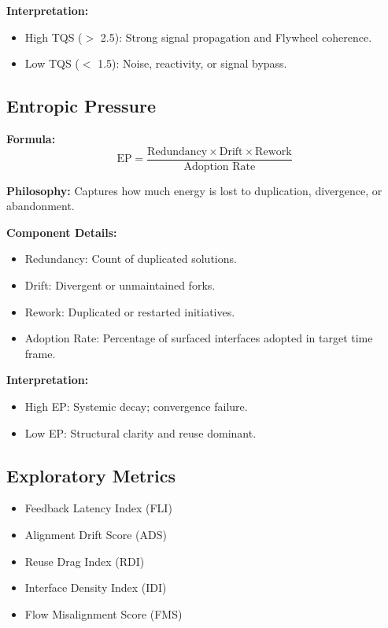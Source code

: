 \documentclass[12pt]{article}
\begin{document}
\textbf{Interpretation:}
\begin{itemize}
    \item High TQS ($>$ 2.5): Strong signal propagation and Flywheel coherence.
    \item Low TQS ($<$ 1.5): Noise, reactivity, or signal bypass.
\end{itemize}

\subsection{Entropic Pressure}

\textbf{Formula:}
\[
\text{EP} = \frac{\text{Redundancy} \times \text{Drift} \times \text{Rework}}{\text{Adoption Rate}}
\]

\textbf{Philosophy:} Captures how much energy is lost to duplication, divergence, or abandonment.

\textbf{Component Details:}
\begin{itemize}
    \item Redundancy: Count of duplicated solutions.
    \item Drift: Divergent or unmaintained forks.
    \item Rework: Duplicated or restarted initiatives.
    \item Adoption Rate: Percentage of surfaced interfaces adopted in target time frame.
\end{itemize}

\textbf{Interpretation:}
\begin{itemize}
    \item High EP: Systemic decay; convergence failure.
    \item Low EP: Structural clarity and reuse dominant.
\end{itemize}

\subsection{Exploratory Metrics}
\begin{itemize}
    \item Feedback Latency Index (FLI)
    \item Alignment Drift Score (ADS)
    \item Reuse Drag Index (RDI)
    \item Interface Density Index (IDI)
    \item Flow Misalignment Score (FMS)
\end{itemize}
\end{document}
